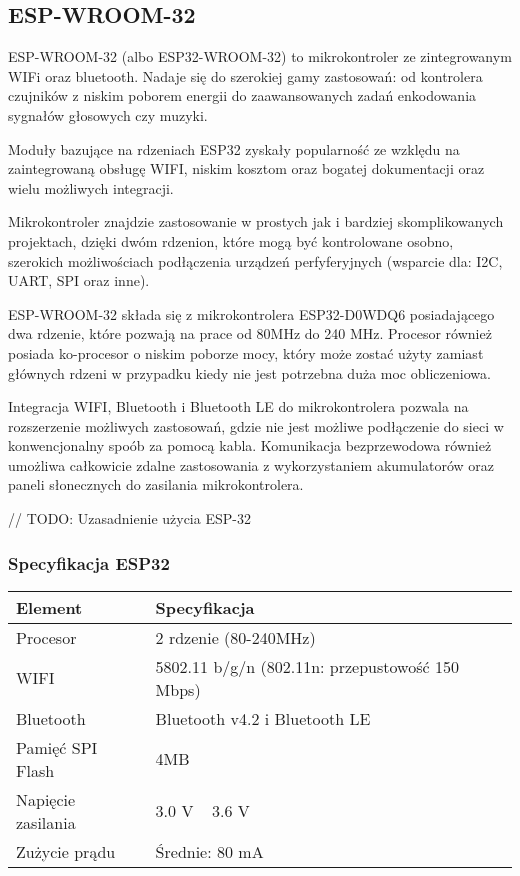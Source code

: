 \documentclass[12pt,a4paper]{article}
\begin{document}
\subsection{ESP-WROOM-32}
ESP-WROOM-32 (albo ESP32-WROOM-32) to mikrokontroler ze zintegrowanym WIFi oraz bluetooth. Nadaje się do szerokiej gamy zastosowań:
od kontrolera czujników z niskim poborem energii do zaawansowanych zadań enkodowania sygnałów głosowych czy muzyki.

Moduły bazujące na rdzeniach ESP32 zyskały popularność ze wzklędu na zaintegrowaną obsługę WIFI, 
niskim kosztom oraz bogatej dokumentacji oraz wielu możliwych integracji.

Mikrokontroler znajdzie zastosowanie w prostych jak i bardziej skomplikowanych projektach, dzięki dwóm rdzenion, które mogą być kontrolowane osobno,
szerokich możliwościach podłączenia urządzeń perfyferyjnych (wsparcie dla: I2C, UART, SPI oraz inne).

ESP-WROOM-32 składa się z mikrokontrolera ESP32-D0WDQ6 posiadającego dwa rdzenie, które pozwają na prace od 80MHz do 240 MHz. Procesor również
posiada ko-procesor o niskim poborze mocy, który może zostać użyty zamiast głównych rdzeni w przypadku kiedy nie jest potrzebna duża moc obliczeniowa.

Integracja WIFI, Bluetooth i Bluetooth LE do mikrokontrolera pozwala na rozszerzenie możliwych zastosowań, gdzie nie jest możliwe podłączenie do sieci
w konwencjonalny spoób za pomocą kabla. Komunikacja bezprzewodowa również umożliwa całkowicie zdalne zastosowania z wykorzystaniem akumulatorów
oraz paneli słonecznych do zasilania mikrokontrolera.

// TODO: Uzasadnienie użycia ESP-32

\subsubsection{Specyfikacja ESP32}
\begin{tabular}{|l|l|}
    \hline
    Element & Specyfikacja \\
    \hline
    Procesor & 2 rdzenie (80-240MHz) \\
    \hline
    WIFI & 5802.11 b/g/n (802.11n: przepustowość 150 Mbps) \\
    \hline
    Bluetooth & Bluetooth v4.2 i Bluetooth LE \\
    \hline
    Pamięć SPI Flash & 4MB \\
    \hline
    Napięcie zasilania & 3.0 V ~ 3.6 V \\
    \hline
    Zużycie prądu & Średnie: 80 mA \\
    \hline
\end{tabular}
\end{document}
